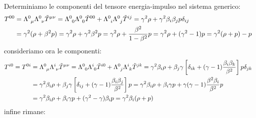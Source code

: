 Determiniamo le componenti del tensore energia-impulso nel sistema generico:
\begin{equation}
\begin{aligned}
    T^{00}&=\Lambda\indices{^0_\mu}\Lambda\indices{^0_\nu}\Tilde{T}\indices{^{\mu\nu}}=\Lambda\indices{^0_0}\Lambda\indices{^0_0}\Tilde{T}\indices{^{00}}+\Lambda\indices{^0_i}\Lambda\indices{^0_j}\Tilde{T}\indices{^{ij}}=\gamma^2\rho+\gamma^2\beta_i\beta_jp\delta_{ij}\\
    &=\gamma^2(\rho+\beta^2p)=\gamma^2\rho+\gamma^2\beta^2p=\gamma^2\rho+\dfrac{\beta^2}{1-\beta^2}p=\gamma^2\rho+(\gamma^2-1)p=\gamma^2(\rho+p)-p
    \end{aligned}
\end{equation}
consideriamo ora le componenti:
\begin{equation}
\begin{aligned}
   T^{i0}= T^{0i}&=\Lambda\indices{^0_\mu}\Lambda\indices{^i_\nu}\Tilde{T}\indices{^{\mu\nu}}=\Lambda\indices{^0_0}\Lambda\indices{^i_0}\Tilde{T}\indices{^{i0}}+\Lambda\indices{^0_j}\Lambda\indices{^i_k}\Tilde{T}\indices{^{jk}}=\gamma^2\beta_i\rho+\beta_j\gamma\left[\delta_{ik}+(\gamma-1)\dfrac{\beta_i\beta_k}{\beta^2}\right]p\delta_{jk}\\
   &=\gamma^2\beta_i\rho+\beta_j\gamma\left[\delta_{ij}+(\gamma-1)\dfrac{\beta_i\beta_j}{\beta^2}\right]p=\gamma^2\beta_i\rho+\beta_i\gamma p+\gamma(\gamma-1)\dfrac{\beta^2\beta_i}{\beta^2}p\\
   &=\gamma^2\beta_i\rho+\beta_i\gamma p+(\gamma^2-\gamma)\beta_ip=\gamma^2\beta_i(\rho+p)
    \end{aligned}
\end{equation}
infine rimane:
